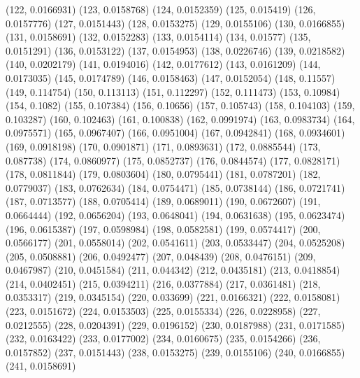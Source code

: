 {					(122, 0.0166931)
					(123, 0.0158768)
					(124, 0.0152359)
					(125, 0.015419)
					(126, 0.0157776)
					(127, 0.0151443)
					(128, 0.0153275)
					(129, 0.0155106)
					(130, 0.0166855)
					(131, 0.0158691)
					(132, 0.0152283)
					(133, 0.0154114)
					(134, 0.01577)
					(135, 0.0151291)
					(136, 0.0153122)
					(137, 0.0154953)
					(138, 0.0226746)
					(139, 0.0218582)
					(140, 0.0202179)
					(141, 0.0194016)
					(142, 0.0177612)
					(143, 0.0161209)
					(144, 0.0173035)
					(145, 0.0174789)
					(146, 0.0158463)
					(147, 0.0152054)
					(148, 0.11557)
					(149, 0.114754)
					(150, 0.113113)
					(151, 0.112297)
					(152, 0.111473)
					(153, 0.10984)
					(154, 0.1082)
					(155, 0.107384)
					(156, 0.10656)
					(157, 0.105743)
					(158, 0.104103)
					(159, 0.103287)
					(160, 0.102463)
					(161, 0.100838)
					(162, 0.0991974)
					(163, 0.0983734)
					(164, 0.0975571)
					(165, 0.0967407)
					(166, 0.0951004)
					(167, 0.0942841)
					(168, 0.0934601)
					(169, 0.0918198)
					(170, 0.0901871)
					(171, 0.0893631)
					(172, 0.0885544)
					(173, 0.087738)
					(174, 0.0860977)
					(175, 0.0852737)
					(176, 0.0844574)
					(177, 0.0828171)
					(178, 0.0811844)
					(179, 0.0803604)
					(180, 0.0795441)
					(181, 0.0787201)
					(182, 0.0779037)
					(183, 0.0762634)
					(184, 0.0754471)
					(185, 0.0738144)
					(186, 0.0721741)
					(187, 0.0713577)
					(188, 0.0705414)
					(189, 0.0689011)
					(190, 0.0672607)
					(191, 0.0664444)
					(192, 0.0656204)
					(193, 0.0648041)
					(194, 0.0631638)
					(195, 0.0623474)
					(196, 0.0615387)
					(197, 0.0598984)
					(198, 0.0582581)
					(199, 0.0574417)
					(200, 0.0566177)
					(201, 0.0558014)
					(202, 0.0541611)
					(203, 0.0533447)
					(204, 0.0525208)
					(205, 0.0508881)
					(206, 0.0492477)
					(207, 0.048439)
					(208, 0.0476151)
					(209, 0.0467987)
					(210, 0.0451584)
					(211, 0.044342)
					(212, 0.0435181)
					(213, 0.0418854)
					(214, 0.0402451)
					(215, 0.0394211)
					(216, 0.0377884)
					(217, 0.0361481)
					(218, 0.0353317)
					(219, 0.0345154)
					(220, 0.033699)
					(221, 0.0166321)
					(222, 0.0158081)
					(223, 0.0151672)
					(224, 0.0153503)
					(225, 0.0155334)
					(226, 0.0228958)
					(227, 0.0212555)
					(228, 0.0204391)
					(229, 0.0196152)
					(230, 0.0187988)
					(231, 0.0171585)
					(232, 0.0163422)
					(233, 0.0177002)
					(234, 0.0160675)
					(235, 0.0154266)
					(236, 0.0157852)
					(237, 0.0151443)
					(238, 0.0153275)
					(239, 0.0155106)
					(240, 0.0166855)
					(241, 0.0158691)
}
